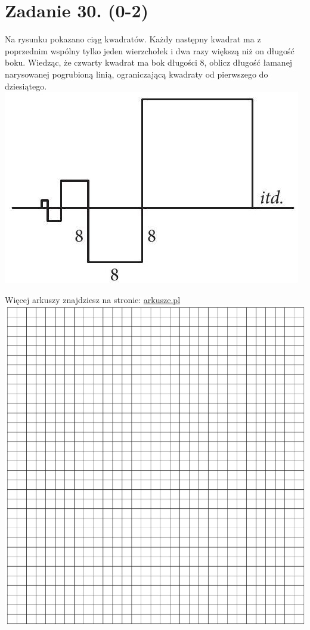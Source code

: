 \documentclass[10pt]{article}
\begin{document}
\section*{Zadanie 30. (0-2)}
Na rysunku pokazano ciąg kwadratów. Każdy następny kwadrat ma z poprzednim wspólny tylko jeden wierzchołek i dwa razy większą niż on długość boku. Wiedząc, że czwarty kwadrat ma bok długości 8, oblicz długość łamanej narysowanej pogrubioną linią, ograniczającą kwadraty od pierwszego do dziesiątego.\\
\includegraphics[max width=\textwidth, center]{2024_11_21_72158d4a4efa7dd894bcg-18}

Więcej arkuszy znajdziesz na stronie: \href{http://arkusze.pl}{arkusze.pl}\\
\includegraphics[max width=\textwidth, center]{2024_11_21_72158d4a4efa7dd894bcg-18(1)}
\end{document}
